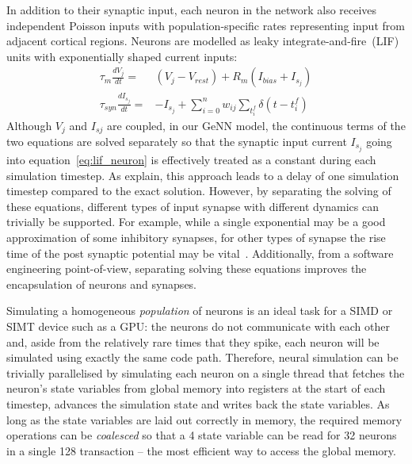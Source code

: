 \documentclass[utf8]{frontiersSCNS} %
\begin{document}
In addition to their synaptic input, each neuron in the network also receives independent Poisson inputs with population-specific rates representing input from adjacent cortical regions.
Neurons are modelled as leaky integrate-and-fire~(LIF) units with exponentially shaped current inputs:
%
\begin{align}
    \tau_{m} \frac{dV_{j}}{dt} = & (V_{j} - V_{rest}) + R_{m}(I_{bias} + I_{s_{j}}) \label{eq:lif_neuron}\\
    \tau_{syn} \frac{dI_{s_{j}}}{dt} = & -I_{s_{j}} + \sum_{i=0}^{n} w_{ij} \sum_{t_{i}^{f}}  \delta(t - t_{i}^{f})\label{eq:exp_neuron_input_current}
\end{align}
%
Although $V_{j}$ and $I_{s{j}}$ are coupled, in our GeNN model, the continuous terms of the two equations are solved separately so that the synaptic input current $I_{s_{j}}$ going into equation~\ref{eq:lif_neuron} is effectively treated as a constant during each simulation timestep.
As \citet{Rotter1999} explain, this approach leads to a delay of one simulation timestep compared to the exact solution.
However, by separating the solving of these equations, different types of input synapse with different dynamics can trivially be supported.
For example, while a single exponential may be a good approximation of some inhibitory synapses, for other types of synapse the rise time of the post synaptic potential may be vital~\citep{VanVreeswijk1994}.
Additionally, from a software engineering point-of-view, separating solving these equations improves the encapsulation of neurons and synapses.

Simulating a homogeneous \textit{population} of neurons is an ideal task for a SIMD or SIMT device such as a GPU: the neurons do not communicate with each other and, aside from the relatively rare times that they spike, each neuron will be simulated using exactly the same code path.
Therefore, neural simulation can be trivially parallelised by simulating each neuron on a single thread that fetches the neuron's state variables from global memory into registers at the start of each timestep, advances the simulation state and writes back the state variables.
As long as the state variables are laid out correctly in memory, the required memory operations can be \textit{coalesced} so that a \SI{4}{\byte} state variable can be read for \num{32} neurons in a single \SI{128}{\byte} transaction -- the most efficient way to access the global memory.
\end{document}
